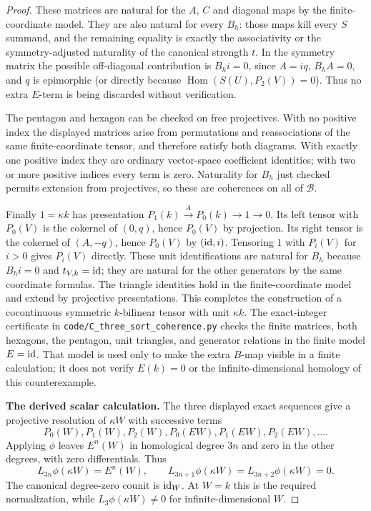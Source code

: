 \begin{proof}
These matrices are natural for the $A$, $C$ and diagonal maps by the finite-coordinate model. They are also natural for every $B_h$: those maps kill every $S$ summand, and the remaining equality is exactly the associativity or the symmetry-adjusted naturality of the canonical strength $t$. In the symmetry matrix the possible off-diagonal contribution is $B_h i=0$, since $A=i q$, $B_h A=0$, and $q$ is epimorphic (or directly because $\operatorname{Hom}(S(U),P_2(V))=0$). Thus no extra $E$-term is being discarded without verification.

The pentagon and hexagon can be checked on free projectives. With no positive index the displayed matrices arise from permutations and reassociations of the same finite-coordinate tensor, and therefore satisfy both diagrams. With exactly one positive index they are ordinary vector-space coefficient identities; with two or more positive indices every term is zero. Naturality for $B_h$ just checked permits extension from projectives, so these are coherences on all of $\mathcal B$.

Finally $1=\kappa k$ has presentation $P_1(k)\xrightarrow{A}P_0(k)\to1\to0$. Its left tensor with $P_0(V)$ is the cokernel of $(0,q)$, hence $P_0(V)$ by projection. Its right tensor is the cokernel of $(A,-q)$, hence $P_0(V)$ by $(\operatorname{id},i)$. Tensoring $1$ with $P_i(V)$ for $i>0$ gives $P_i(V)$ directly. These unit identifications are natural for $B_h$ because $B_h i=0$ and $t_{V,k}=\operatorname{id}$; they are natural for the other generators by the same coordinate formulas. The triangle identities hold in the finite-coordinate model and extend by projective presentations. This completes the construction of a cocontinuous symmetric $k$-bilinear tensor with unit $\kappa k$. The exact-integer certificate in \texttt{code/C\_three\_sort\_coherence.py} checks the finite matrices, both hexagons, the pentagon, unit triangles, and generator relations in the finite model $E=\operatorname{id}$. That model is used only to make the extra $B$-map visible in a finite calculation; it does not verify $E(k)=0$ or the infinite-dimensional homology of this counterexample.

\textbf{The derived scalar calculation.}
The three displayed exact sequences give a projective resolution of $\kappa W$ with successive terms
\[
P_0(W),P_1(W),P_2(W),P_0(EW),P_1(EW),P_2(EW),\ldots.
\]
Applying $\phi$ leaves $E^n(W)$ in homological degree $3n$ and zero in the other degrees, with zero differentials. Thus
\[
L_{3n}\phi(\kappa W)=E^n(W),\qquad
L_{3n+1}\phi(\kappa W)=L_{3n+2}\phi(\kappa W)=0.
\]
The canonical degree-zero counit is $\operatorname{id}_W$. At $W=k$ this is the required normalization, while $L_3\phi(\kappa W)\ne0$ for infinite-dimensional $W$.


\end{proof}
